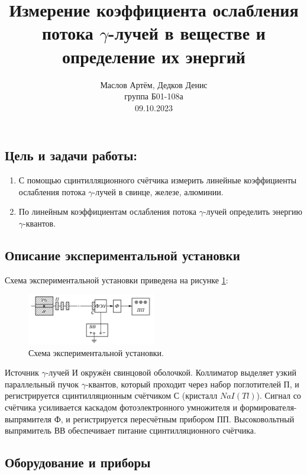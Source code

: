 \documentclass[10pt,a4paper]{article}
\author{\normalsize Маслов Артём, Дедков Денис \\
	\normalsize группа Б01-108а \\
	\normalsize 09.10.2023}
\date{}
\title{
	\Large Измерение коэффициента ослабления потока $\gamma$-лучей в веществе и определение их энергий \\ 
}
\begin{document}
\maketitle
	
	\subsection*{Цель и задачи работы:}
	\begin{enumerate}
		\item С помощью сцинтилляционного счётчика измерить линейные коэффициенты ослабления потока $\gamma$-лучей в свинце, железе, алюминии.
		
		\item По линейным коэффициентам ослабления потока $\gamma$-лучей определить энергию $\gamma$-квантов.
	\end{enumerate}
	
	\subsection*{Описание экспериментальной установки}
	
	Схема экспериментальной установки приведена на рисунке \ref{img:exp_scheme}:
	\begin{figure}[H]
		\centering
		\includegraphics[width=0.5\textwidth]{images/exp_scheme.png}
		\caption{Схема экспериментальной установки.}
		\label{img:exp_scheme}
	\end{figure}

	Источник $\gamma$-лучей И окружён свинцовой оболочкой. Коллиматор выделяет узкий параллельный пучок $\gamma$-квантов, который проходит через набор поглотителей П, и регистрируется сцинтилляционным счётчиком С (кристалл $NaI(Tl)$). Сигнал со счётчика усиливается каскадом фотоэлектронного умножителя и формирователя-выпрямителя Ф, и регистрируется пересчётным прибором ПП. Высоковольтный выпрямитель ВВ обеспечивает питание сцинтилляционного счётчика.
	
	\subsection*{Оборудование и приборы}
	
\end{document}
